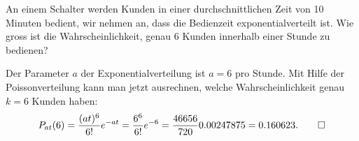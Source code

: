 An einem Schalter werden Kunden in einer durchschnittlichen
Zeit von 10 Minuten bedient, wir nehmen an, dass die Bedienzeit
exponentialverteilt ist. Wie gross ist die Wahrscheinlichkeit,
genau 6 Kunden innerhalb einer Stunde zu bedienen?

\begin{loesung}
Der Parameter $a$ der Exponentialverteilung ist $a=6$ pro Stunde.
Mit Hilfe der Poissonverteilung kann man jetzt ausrechnen,
welche Wahrscheinlichkeit genau $k=6$ Kunden haben:
\[
P_{at}(6)=\frac{(at)^6}{6!}e^{-at}=\frac{6^6}{6!}e^{-6}
=\frac{46656}{720}0.00247875
=0.160623.
\qedhere
\]
\end{loesung}
